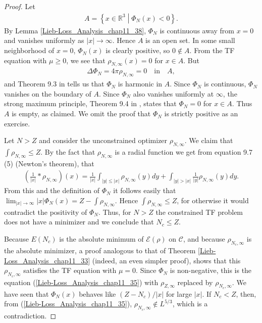 \documentclass[openany, a4paper, oneside]{jsbook}
\theoremstyle{break}
\theoremstyle{breakdefn}
\newcommand{\abs}[1]{\left|#1\right|}
\newcommand{\rbk}[1]{\left (#1\right)}
\newcommand{\relmiddle}[1]{\mathrel{}\middle#1\mathrel{}}
\newcommand{\set}[2]{\left\{#1 \relmiddle| #2\right\}}
\newcommand{\bbRthree}{\mathbb{R}^3}
\newcommand{\calC}{\mathcal{C}}
\newcommand{\calE}{\mathcal{E}}
\newcommand{\rhoNinfty}{\rho_{N, \infty}}
\begin{document}
\begin{proof}
Let
\begin{align}
 A
 =
 \set{x \in \bbRthree}{\Phi_N (x) < 0}.
\end{align}
By Lemma \ref{Lieb-Loss_Analysis_chap11_38},
$\Phi_N$ is continuous away from $x=0$ and vanishes uniformly as $\abs{x} \to \infty$.
Hence $A$ is an open set.
In some small neighborhood of $x=0$, $\Phi_N (x)$ is clearly positive, so $0 \notin A$.
From the TF equation with $\mu \geq 0$,
we see that $\rhoNinfty (x) = 0$ for $x \in A$.
But
\begin{align}
 \Delta \Phi_N = 4 \pi \rhoNinfty = 0 \quad \text{in}  \quad A,
\end{align}
and Theorem 9.3 in \cite{LiebLoss1} tells us that $\Phi_N$ is harmonic in $A$.
Since $\Phi_N$ is continuous, $\Phi_N$ vanishes on the boundary of $A$.
Since $\Phi_N$ also vanishes uniformly at $\infty$, the strong maximum principle, Theorem 9.4 in \cite{LiebLoss1},
states that $\Phi_N = 0$ for $x \in A$.
Thus $A$ is empty, as claimed.
We omit the proof that $\Phi_N$ is strictly positive as an exercise.

Let $N > Z$ and consider the unconstrained optimizer $\rhoNinfty$.
We claim that $\int \rhoNinfty \leq Z$.
By the fact that $\rhoNinfty$ is a radial function we get from equation 9.7 (5) \cite{LiebLoss1} (Newton's theorem),
that
\begin{align}
 \rbk{\frac{1}{\abs{x}} * \rhoNinfty} (x)
 =
 \frac{1}{\abs{x}} \int_{\abs{y} \leq \abs{x}} \rhoNinfty (y) dy
  +\int_{\abs{y} > \abs{x}} \frac{1}{\abs{y}} \rhoNinfty (y) dy.
\end{align}
From this and the definition of $\Phi_N$ it follows easily that $\lim_{\abs{x} \to \infty} \abs{x} \Phi_N (x) = Z - \int \rhoNinfty$.
Hence $\int \rhoNinfty \leq Z$, for otherwise it would contradict the positivity of $\Phi_N$.
Thus, for $N > Z$ the constrained TF problem does not have a minimizer and we conclude that $N_c \leq Z$.

Because $E (N_c)$ is the absolute minimum of $\calE (\rho)$ on $\calC$,
and because $\rho_{N_c, \infty}$ is the absolute minimizer, a proof analogous to that of Theorem \ref{Lieb-Loss_Analysis_chap11_33}
(indeed, an even simpler proof), shows that this $\rho_{N_c, \infty}$ satisfies the TF equation with $\mu = 0$.
Since $\Phi_N$ is non-negative, this is the equation (\ref{Lieb-Loss_Analysis_chap11_35}) with $\rho_{Z, \infty}$ replaced by $\rho_{N_c, \infty}$.
We have seen that $\Phi_N (x)$ behaves like $(Z - N_c)/ \abs{x}$ for large $\abs{x}$.
If $N_c < Z$, then, from (\ref{Lieb-Loss_Analysis_chap11_35}), $\rho_{N_c, \infty} \notin L^{5/3}$, which is a contradiction.
\end{proof}
\end{document}
